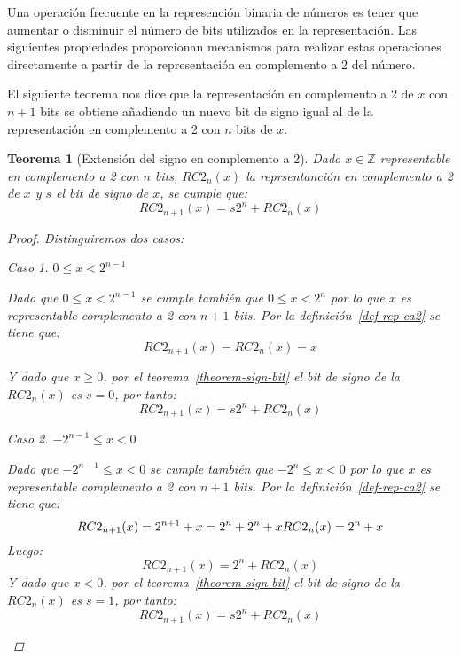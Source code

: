 \documentclass[spanish,a4paper,12pt,titlepage]{article}
\newtheorem{theorem}{Teorema}%
\theoremstyle{definition}
\theoremstyle{remark}
\newtheorem{case}{Caso}
\newcommand{\bbZ}{\mathbb{Z}}
\begin{document}
Una operación frecuente en la represención binaria de números es tener que aumentar o disminuir el número de bits utilizados en la representación. Las siguientes propiedades proporcionan mecanismos para realizar estas operaciones directamente a partir de la representación en complemento a 2 del número.

El siguiente teorema nos dice que la representación en complemento a 2 de $x$ con $n+1$ bits se obtiene añadiendo un nuevo bit de signo igual al de la representación en complemento a 2 con $n$ bits de $x$.

\begin{theorem}[Extensión del signo en complemento a 2]
    Dado $x \in \bbZ$ representable en complemento a 2 con $n$ bits, $RC2_n(x)$ la reprsentanción en complemento a 2 de $x$ y $s$ el bit de signo de $x$, se cumple que:
    \[
        RC2_{n+1}(x) = s 2^n + RC2_n(x)
    \]
    \begin{proof}
        Distinguiremos dos casos:
        \begin{case}
            $0 \le x < 2^{n-1}$

            Dado que $0 \le x < 2^{n-1}$ se cumple también que $0 \le x < 2^n$ por lo que $x$ es representable complemento a 2 con $n+1$ bits. Por la definición~\ref{def-rep-ca2} se tiene que:
            \[
                RC2_{n+1}(x) = RC2_n(x) = x
            \]

            Y dado que $x \ge 0$, por el teorema~\ref{theorem-sign-bit} el bit de signo de la $RC2_n(x)$ es $s=0$, por tanto:
            \[
                RC2_{n+1}(x) = s 2^n + RC2_n(x)
            \]
        \end{case}
        \begin{case}
            $-2^{n-1} \le x < 0$

            Dado que $-2^{n-1} \le x < 0$ se cumple también que $-2^n \le x < 0$ por lo que $x$ es representable complemento a 2 con $n+1$ bits. Por la definición~\ref{def-rep-ca2} se tiene que:
            \[
                RC2_{n+1}(x) = 2^{n+1} + x = 2^n + 2^n + x\\
                RC2_n(x) = 2^n + x
            \]
            Luego:
            \[
                RC2_{n+1}(x) = 2^n + RC2_n(x)
            \]
            Y dado que $x < 0$, por el teorema~\ref{theorem-sign-bit} el bit de signo de la $RC2_n(x)$ es $s=1$, por tanto:
            \[
                RC2_{n+1}(x) = s 2^n + RC2_n(x)
            \]
        \end{case}
    \end{proof}
\end{theorem}
\end{document}
